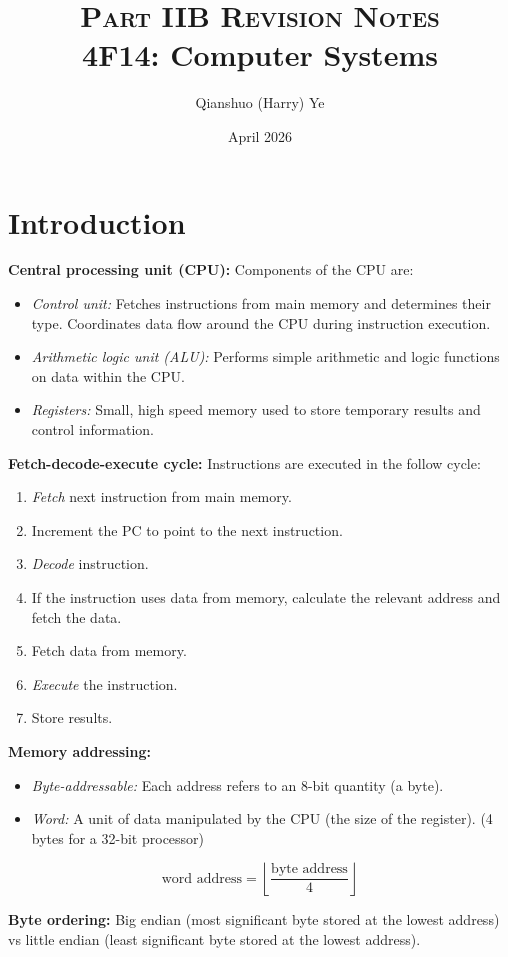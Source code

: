 \documentclass[12pt]{article}
\title{
    {\scshape  Part IIB Revision Notes} \\ 
    \vspace{0.5em}
    \textbf{4F14: Computer Systems}}
\author{Qianshuo (Harry) Ye}
\date{April 2026}
\begin{document}
\maketitle

\section{Introduction}
\textbf{Central processing unit (CPU):} Components of the CPU are:
\begin{itemize}
    \item \textit{Control unit:} Fetches instructions from main memory and determines their type. Coordinates data flow around the CPU during instruction execution.
    \item \textit{Arithmetic logic unit (ALU):} Performs simple arithmetic and logic functions on data within the CPU.
    \item \textit{Registers:} Small, high speed memory used to store temporary results and control information.
\end{itemize}

\textbf{Fetch-decode-execute cycle:} Instructions are executed in the follow cycle:
\begin{enumerate}
    \item \textit{Fetch} next instruction from main memory.
    \item Increment the PC to point to the next instruction.
    \item \textit{Decode} instruction.
    \item If the instruction uses data from memory, calculate the relevant address and fetch the data.
    \item Fetch data from memory.
    \item \textit{Execute} the instruction.
    \item Store results.
\end{enumerate}

\textbf{Memory addressing:}
\begin{itemize}
    \item \textit{Byte-addressable:} Each address refers to an 8-bit quantity (a byte).
    \item \textit{Word:} A unit of data manipulated by the CPU (the size of the register). (4 bytes for a 32-bit processor)
\end{itemize}
$$
\text{word address} = \left\lfloor \frac{\text{byte address}}{4} \right\rfloor
$$

\textbf{Byte ordering:} Big endian (most significant byte stored at the lowest address) vs little endian (least significant byte stored at the lowest address).
\end{document}
